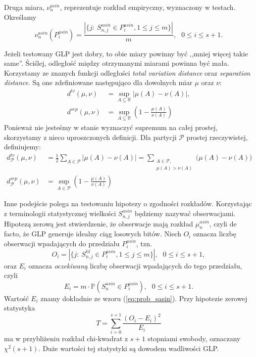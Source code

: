 \documentclass[a4paper,11pt,twoside]{book}
\newcommand{\Pro}[1]{\mathbb{P}\left(#1\right)}
\newcommand{\Slil}[1]{S^{lil}_#1}
\newcommand{\Sasin}[1]{S^{asin}_#1}
\theoremstyle{definition}
\begin{document}
Druga miara, $\nu^{asin}_n$,  reprezentuje rozkład empiryczny, wyznaczony w testach. Określamy
\begin{equation}
 \nu^{asin}_n \left( P^{asin}_i \right) = \frac{|\{ j:\ \Sasin{{n,j}} \in  P^{asin}_i, 1 \leq j \leq m\}|}{m},\ \ \ 0 \leq i \leq s+1.
\end{equation}


Jeżeli testowany GLP jest dobry, to obie miary powinny być ,,mniej więcej takie same''. Ściślej, odległość między otrzymanymi miarami powinna być mała. Korzystamy ze znanych funkcji odległości \textit{total variation distance} oraz \textit{separation distance}. Są one zdefiniowane następująco dla dowolnych miar $\mu$ oraz $\nu$:
\begin{align}
 d^{tv}(\mu, \nu) &= \sup_{A \subseteq \mathbb{R}} |\mu(A) - \nu(A)|,\\
 d^{sep}(\mu, \nu) &= \sup_{A \subseteq \mathbb{R}} \left(1 - \frac{\mu(A)}{\nu(A)}\right)
\end{align}
Ponieważ nie jesteśmy w stanie wyznaczyć supremum na całej prostej, skorzystamy z nieco uproszczonych definicji. Dla partycji $\mathcal{P}$ prostej rzeczywistej, definiujemy:
\begin{align}
 d^{tv}_\mathcal{P}(\mu, \nu) &= \frac{1}{2} \sum_{A \in \mathcal{P}} |\mu(A) - \nu(A)|
    = \sum_{\substack{A \in \mathcal{P},\\ \mu(A) >\nu(A)}} \Big(\mu(A) - \nu(A)\Big)\\
 d^{sep}_\mathcal{P}(\mu, \nu) &= \sup_{A \in \mathcal{P}}\left(1 - \frac{\mu(A)}{\nu(A)}\right)
\end{align}

Inne podejście polega na testowaniu hipotezy o zgodności rozkładów. Korzystając z terminologii statystycznej wielkości $\Sasin{{n,j}}$ będziemy nazywać obserwacjami. Hipotezą zerową jest stwierdzenie, że obserwacje mają rozkład $\mu^{asin}_n$, czyli de facto, że GLP generuje idealny ciąg losowych bitów. Niech $O_i$ oznacza liczbę obserwacji wpadających do przedziału $P^{asin}_i$, tzn.
\begin{equation}
 O_i = |\{ j:\ \Slil{{n,j}} \in  P^{asin}_i, 1 \leq j \leq m\}|,\ \ \ 0 \leq i \leq s+1,
\end{equation}
oraz $E_i$ oznacza \textit{oczekiwaną} liczbę obserwacji wpadających do tego przedziału, czyli
\begin{equation}
 E_i = m \cdot \Pro{\Sasin{n} \in P^{asin}_i},\ \ \ 0 \leq i \leq s+1.
\end{equation}
Wartość $E_i$ znamy dokładnie ze wzoru (\ref{eq:prob_sasin}). Przy hipotezie zerowej statystyka
\begin{equation}
 T = \sum_{i=0}^{s+1} \frac{(O_i - E_i)^2}{E_i}
\end{equation}
ma w przybliżeniu rozkład chi-kwadrat z $s+1$ stopniami swobody, oznaczany $\chi^2(s+1)$. Duże wartości tej statystyki są dowodem wadliwości GLP.
\end{document}
